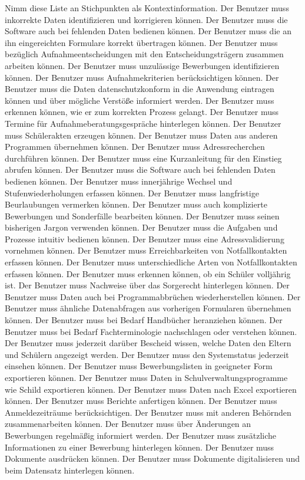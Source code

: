 Nimm diese Liste an Stichpunkten als Kontextinformation.
Der Benutzer muss inkorrekte Daten identifizieren und korrigieren können.
Der Benutzer muss die Software auch bei fehlenden Daten bedienen können. 
Der Benutzer muss die an ihn eingereichten Formulare korrekt übertragen können.
Der Benutzer muss bezüglich Aufnahmeentscheidungen mit den Entscheidungsträgern zusammen arbeiten können.
Der Benutzer muss unzulässige Bewerbungen identifizieren können.
Der Benutzer muss Aufnahmekriterien berücksichtigen können.
Der Benutzer muss die Daten datenschutzkonform in die Anwendung eintragen können und über mögliche Verstöße informiert werden.
Der Benutzer muss erkennen können, wie er zum korrekten Prozess gelangt.
Der Benutzer muss Termine für Aufnahmeberatungsgespräche hinterlegen können.
Der Benutzer muss Schülerakten erzeugen können.
Der Benutzer muss Daten aus anderen Programmen übernehmen können.
Der Benutzer muss Adressrecherchen durchführen können.
Der Benutzer muss eine Kurzanleitung für den Einstieg abrufen können.
Der Benutzer muss die Software auch bei fehlenden Daten bedienen können.
Der Benutzer muss innerjährige Wechsel und Stufenwiederholungen erfassen können.
Der Benutzer muss langfristige Beurlaubungen vermerken können.
Der Benutzer muss auch komplizierte Bewerbungen und Sonderfälle bearbeiten können.
Der Benutzer muss seinen bisherigen Jargon verwenden können.
Der Benutzer muss die Aufgaben und Prozesse intuitiv bedienen können.
Der Benutzer muss eine Adressvalidierung vornehmen können.
Der Benutzer muss Erreichbarkeiten von Notfallkontakten erfassen können.
Der Benutzer muss unterschiedliche Arten von Notfallkontakten erfassen können.
Der Benutzer muss erkennen können, ob ein Schüler volljährig ist.
Der Benutzer muss Nachweise über das Sorgerecht hinterlegen können.
Der Benutzer muss Daten auch bei Programmabbrüchen wiederherstellen können.
Der Benutzer muss ähnliche Datenabfragen aus vorherigen Formularen übernehmen können.
Der Benutzer muss bei Bedarf Handbücher heranziehen können.
Der Benutzer muss bei Bedarf Fachterminologie nachschlagen oder verstehen können.
Der Benutzer muss jederzeit darüber Bescheid wissen, welche Daten den Eltern und Schülern angezeigt werden.
Der Benutzer muss den Systemstatus jederzeit einsehen können.
Der Benutzer muss Bewerbungslisten in geeigneter Form exportieren können.
Der Benutzer muss Daten in Schulverwaltungsprogramme wie Schild exportieren können.
Der Benutzer muss Daten nach Excel exportieren können.
Der Benutzer muss Berichte anfertigen können.
Der Benutzer muss Anmeldezeiträume berücksichtigen.
Der Benutzer muss mit anderen Behörnden zusammenarbeiten können.
Der Benutzer muss über Änderungen an Bewerbungen regelmäßig informiert werden.
Der Benutzer muss zusätzliche Informationen zu einer Bewerbung hinterlegen können.
Der Benutzer muss Dokumente ausdrücken können.
Der Benutzer muss Dokumente digitalisieren und beim Datensatz hinterlegen können.

